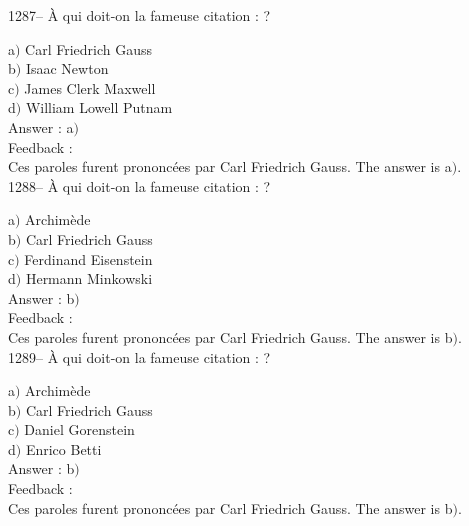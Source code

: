 ﻿\documentclass[letterpaper, 12pt]{article}
\begin{document}
1287-- \`A qui doit-on la fameuse citation : \fg?

a$)$ Carl Friedrich Gauss \\
b$)$ Isaac Newton \\
c$)$ James Clerk Maxwell \\
d$)$ William Lowell Putnam\\

Answer : a$)$\\

Feedback : \\
Ces paroles furent prononc\'ees par Carl Friedrich Gauss.
The answer is  a$)$.\\

1288-- \`A qui doit-on la fameuse citation : \fg ?

a$)$ Archim\`ede \\
b$)$ Carl Friedrich Gauss \\
c$)$ Ferdinand Eisenstein \\
d$)$ Hermann Minkowski\\

Answer : b$)$\\

Feedback : \\
Ces paroles furent prononc\'ees par Carl Friedrich Gauss.
The answer is  b$)$.\\

1289-- \`A qui doit-on la fameuse citation : \fg ?

a$)$ Archim\`ede \\
b$)$ Carl Friedrich Gauss \\
c$)$ Daniel Gorenstein \\
d$)$ Enrico Betti\\

Answer : b$)$\\

Feedback : \\
Ces paroles furent prononc\'ees par Carl Friedrich Gauss.
The answer is  b$)$.\\
\end{document}
